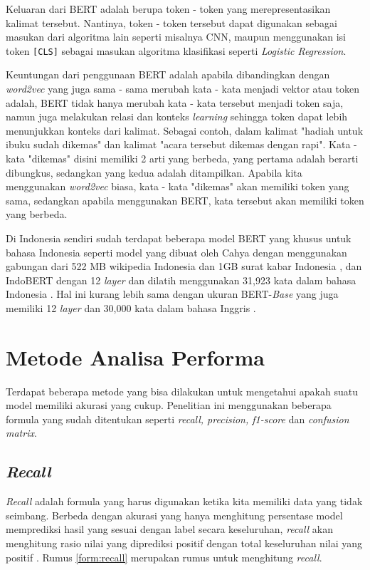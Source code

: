 Keluaran dari BERT adalah berupa token - token yang merepresentasikan kalimat tersebut. Nantinya, token - token tersebut dapat digunakan sebagai masukan dari algoritma lain seperti misalnya CNN, maupun menggunakan isi token \texttt{[CLS]} sebagai masukan algoritma klasifikasi seperti \textit{Logistic Regression}.

Keuntungan dari penggunaan BERT adalah apabila dibandingkan dengan \textit{word2vec} yang juga sama - sama merubah kata - kata menjadi vektor atau token adalah, BERT tidak hanya merubah kata - kata tersebut menjadi token saja, namun juga melakukan relasi dan konteks \textit{learning} sehingga token dapat lebih menunjukkan konteks dari kalimat. Sebagai contoh, dalam kalimat "hadiah untuk ibuku sudah dikemas" dan kalimat "acara tersebut dikemas dengan rapi". Kata - kata "dikemas" disini memiliki 2 arti yang berbeda, yang pertama adalah berarti dibungkus, sedangkan yang kedua adalah ditampilkan. Apabila kita menggunakan \textit{word2vec} biasa, kata - kata "dikemas" akan memiliki token yang sama, sedangkan apabila menggunakan BERT, kata tersebut akan memiliki token yang berbeda. \cite{coenen2019visualizing}

Di Indonesia sendiri sudah terdapat beberapa model BERT yang khusus untuk bahasa Indonesia seperti model yang dibuat oleh Cahya dengan menggunakan gabungan dari 522 MB wikipedia Indonesia dan 1GB surat kabar Indonesia \cite{cahya_bert}, dan IndoBERT dengan 12 \textit{layer} dan dilatih menggunakan 31,923 kata dalam bahasa Indonesia \cite{koto2020indolem}. Hal ini kurang lebih sama dengan ukuran BERT-\textit{Base} yang juga memiliki 12 \textit{layer} dan 30,000 kata dalam bahasa Inggris \cite{devlin2019bert}.

\section{Metode Analisa Performa}
Terdapat beberapa metode yang bisa dilakukan untuk mengetahui apakah suatu model memiliki akurasi yang cukup. Penelitian ini menggunakan beberapa formula yang sudah ditentukan seperti \textit{recall, precision, f1-score} dan \textit{confusion matrix}.

\subsection{\textit{Recall}}

\textit{Recall} adalah formula yang harus digunakan ketika kita memiliki data yang tidak seimbang. Berbeda dengan akurasi yang hanya menghitung persentase model memprediksi hasil yang sesuai dengan label secara keseluruhan, \textit{recall} akan menghitung rasio nilai yang diprediksi positif dengan total keseluruhan nilai yang positif \cite{metrics_ml}. Rumus \ref{form:recall} merupakan rumus untuk menghitung \textit{recall}.

